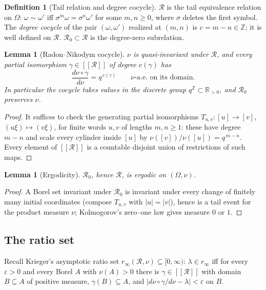 \documentclass[11pt]{amsart}
\numberwithin{equation}{section}
\newtheorem{lemma}[theorem]{Lemma}
\theoremstyle{definition}
\newtheorem{definition}[theorem]{Definition}
\theoremstyle{remark}
\newcommand{\Z}{\mathbb{Z}}
\newcommand{\R}{\mathbb{R}}
\newcommand{\cR}{\mathcal{R}}
\begin{document}
\begin{definition}[Tail relation and degree cocycle]
$\cR$ is the tail equivalence relation on $\Omega$:
$\omega\sim\omega'$ iff $\sigma^m\omega=\sigma^n\omega'$ for some $m,n\ge0$, where
$\sigma$ deletes the first symbol. The \emph{degree cocycle} of the pair
$(\omega,\omega')$ realized at $(m,n)$ is $c=m-n\in\Z$; it is well defined on $\cR$.
$\cR_0\subset\cR$ is the degree-zero subrelation.
\end{definition}

\begin{lemma}[Radon--Nikodym cocycle]\label{lem:rn}
$\nu$ is quasi-invariant under $\cR$, and every partial isomorphism
$\gamma\in[[\cR]]$ of degree $c(\gamma)$ has
\[
\frac{d\nu\circ\gamma}{d\nu}=q^{\,c(\gamma)}\qquad\nu\text{-a.e.\ on its domain.}
\]
In particular the cocycle takes values in the discrete group $q^{\Z}\subset\R_{>0}$,
and $\cR_0$ preserves $\nu$.
\end{lemma}

\begin{proof}
It suffices to check the generating partial isomorphisms
$T_{u,v}\colon[u]\to[v]$, $(u\xi)\mapsto(v\xi)$, for finite words $u,v$ of lengths
$m,n\ge1$: these have degree $m-n$ and scale every cylinder inside $[u]$ by
$\nu([v])/\nu([u])=q^{\,m-n}$. Every element of $[[\cR]]$ is a countable disjoint union
of restrictions of such maps.
\end{proof}

\begin{lemma}[Ergodicity]\label{lem:ergodic}
$\cR_0$, hence $\cR$, is ergodic on $(\Omega,\nu)$.
\end{lemma}

\begin{proof}
A Borel set invariant under $\cR_0$ is invariant under every change of finitely many
initial coordinates (compose $T_{u,v}$ with $|u|=|v|$), hence is a tail event for the
product measure $\nu$; Kolmogorov's zero--one law gives measure $0$ or $1$.
\end{proof}

\subsection{The ratio set}

Recall Krieger's asymptotic ratio set $r_\infty(\cR,\nu)\subseteq[0,\infty)$:
$\lambda\in r_\infty$ iff for every $\varepsilon>0$ and every Borel $A$ with
$\nu(A)>0$ there is $\gamma\in[[\cR]]$ with domain $B\subseteq A$ of positive measure,
$\gamma(B)\subseteq A$, and $|d\nu\circ\gamma/d\nu-\lambda|<\varepsilon$ on $B$.
\end{document}
